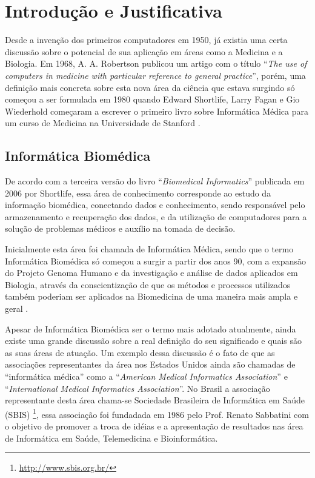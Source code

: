 

\chapter[Introdução e Justificativa]{Introdução e Justificativa}

Desde a invenção dos primeiros computadores em 1950, já existia uma certa discussão sobre o potencial de sua aplicação em áreas como a Medicina e a Biologia. Em 1968, A. A. Robertson  publicou um artigo com o título ``\textit{The use of computers in medicine with particular reference to general practice}'', porém, uma definição mais concreta sobre esta nova área da ciência que estava surgindo só começou a ser formulada em 1980 quando Edward Shortlife, Larry Fagan e Gio Wiederhold começaram a escrever o primeiro livro sobre Informática Médica para um curso de Medicina na Universidade de Stanford \cite{biomed_info}.

\section{Informática Biomédica}

De acordo com a terceira versão do livro ``\textit{Biomedical Informatics}'' publicada em 2006 por Shortlife, essa área de conhecimento corresponde ao estudo da informação biomédica, conectando dados e conhecimento, sendo responsável pelo armazenamento e recuperação dos dados, e da utilização de computadores para a solução de problemas médicos e auxílio na tomada de decisão.

Inicialmente esta área foi chamada de Informática Médica, sendo que o termo Informática Biomédica só começou a surgir a partir dos anos 90, com a expansão do Projeto Genoma Humano e da investigação e análise de dados aplicados em Biologia, através da conscientização de que os métodos e processos utilizados também poderiam ser aplicados na Biomedicina de uma maneira mais ampla e geral \cite{Kulikowski2012}.

Apesar de Informática Biomédica ser o termo mais adotado atualmente, ainda existe uma grande discussão sobre a real definição do seu significado e quais são as suas áreas de atuação. Um exemplo dessa discussão é o fato de que as associações representantes da área nos Estados Unidos ainda são chamadas de ``informática médica'' como a ``\textit{American Medical Informatics Association}'' e ``\textit{International Medical Informatics Association}''. No Brasil a associação representante desta área chama-se Sociedade Brasileira de Informática em Saúde (SBIS) \footnote{\url{http://www.sbis.org.br/}}, essa associação foi fundadada em 1986 pelo Prof. Renato Sabbatini com o objetivo de promover a troca de idéias e a apresentação de resultados nas área de Informática em Saúde, Telemedicina e Bioinformática.

